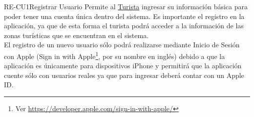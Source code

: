 
% 



	\begin{UseCase}{RE-CU1}{Registrar Usuario}{
		Permite al \hyperlink{actor:turista}{Turista} ingresar su información básica para poder tener una cuenta única dentro del sistema. Es importante el registro en la aplicación, ya que de esta forma el turista podrá acceder a la información de las zonas turísticas que se encuentran en el sistema.\\
		
		El registro de un nuevo usuario sólo podrá realizarse mediante Inicio de Sesión con Apple (Sign in with Apple\footnote{Ver \url{https://developer.apple.com/sign-in-with-apple/}}, por su nombre en inglés) debido a que la aplicación es únicamente para dispositivos iPhone y permitirá que la aplicación cuente sólo con usuarios reales ya que para ingresar deberá contar con un Apple ID.\\
		
}
\end{UseCase}
